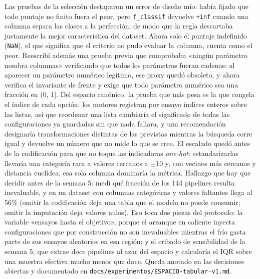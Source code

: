 \documentclass[11pt,letterpaper]{article}
\begin{document}
{Las pruebas de la selección destaparon un error de diseño mío: había fijado que todo
 puntaje no finito fuera el peor, pero \texttt{f\_classif} devuelve \texttt{+inf} cuando
 una columna separa las clases a la perfección, de modo que la regla descartaba justamente
 la mejor característica del dataset. Ahora solo el puntaje indefinido (\texttt{NaN}), el
 que significa que el criterio no pudo evaluar la columna, cuenta como el peor. Reescribí
 además una prueba previa que comprobaba «ningún parámetro nombra columnas» verificando
 que todos los parámetros fueran cadenas: al aparecer un parámetro numérico legítimo, ese
 proxy quedó obsoleto, y ahora verifica el invariante de frente y exige que todo parámetro
 numérico sea una fracción en (0, 1]. Del espacio canónico, la prueba que más pesa es la
 que congela el índice de cada opción: los motores registran por ensayo índices enteros
 sobre las listas, así que reordenar una lista cambiaría el significado de todas las
 configuraciones ya guardadas sin que nada fallara, y una recomendación designaría
 transformaciones distintas de las previstas mientras la búsqueda corre igual y devuelve
 un número que no mide lo que se cree. El escalado quedó antes de la codificación para que
 no toque las indicadoras \textit{one-hot}: estandarizarlas llevaría una categoría rara a
 valores cercanos a $\pm$10 y, con vecinos más cercanos y distancia euclídea, esa sola
 columna dominaría la métrica. Hallazgo que hay que decidir antes de la semana 5: medí qué
 fracción de los 144 pipelines resulta inevaluable, y en un dataset con columnas
 categóricas y valores faltantes llega al 56\% (omitir la codificación deja una tabla que
 el modelo no puede consumir; omitir la imputación deja valores nulos). Eso toca dos piezas
 del protocolo: la variable «ensayos hasta el objetivo», porque el arranque en caliente
 inyecta configuraciones que por construcción no son inevaluables mientras el frío gasta
 parte de sus ensayos aleatorios en esa región; y el cribado de sensibilidad de la semana
 5, que extrae doce pipelines al azar del espacio y calcularía el IQR sobre una muestra
 efectiva mucho menor que doce. Queda anotado en las decisiones abiertas y documentado en
 \texttt{docs/experimentos/ESPACIO-tabular-v1.md}.}
\end{document}
